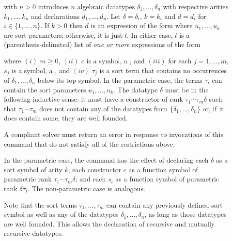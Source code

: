 \begin{description}
%
\item[%
]
with $n > 0$ introduces $n$ algebraic datatypes $\delta_1,\dots,\delta_n$
with respective arities $k_1,\dots,k_n$ and declarations $d_1,\dots,d_n$. 
Let $\delta = \delta_i$, $k = k_i$ and $d = d_i$ for $i \in \{1,\ldots,n\}$.
If $k >0$ then $d$ is an expression of the form 
where $u_1, \ldots, u_k$ are sort parameters;
otherwise, it is just $l$. 
In either case, $l$ is a (parenthesis-delimited) list of \emph{one or more} 
expressions of the form
%
\begin{center}
\end{center}
where 
$(i)$ $m \geq 0$, 
$(ii)$ $c$ is a symbol, a , and 
$(iii)$ for each $j=1,\ldots,m$, $s_j$ is a symbol, a , and 
$(iv)$ $\tau_j$ is a sort term
that contains no occurrences of $\delta_1, \ldots, \delta_n$ below its top symbol.
In the parametric case,
the terms $\tau_i$ can contain the sort parameters $u_1, \ldots, u_k$.
The datatype $\delta$ must be  in the following inductive sense:
it must have a constructor of rank $\tau_1\cdots\tau_m\delta$ 
such that $\tau_1\cdots\tau_m$ does not contain any of the datatypes 
from $\{\delta_1, \ldots, \delta_n\}$ or, if it does contain some, they are well founded.

A compliant solver must return an error in response to invocations of this command 
that do not satisfy all of the restrictions above.  

In the parametric case, 
the command has the effect of declaring each $\delta$ as a sort symbol of arity $k$;
each constructor $c$ as a function symbol of parametric rank $\tau_1\cdots\tau_m\delta$;
and each $s_i$ as a function symbol of parametric rank $\delta\tau_i$.
The non-parametric case is analogous.

Note that the sort terms $\tau_1, \ldots,\tau_m$ can contain any previously defined 
sort symbol as well as any of the datatypes $\delta_1, \ldots, \delta_n$,
as long as those datatypes are well founded.
This allows the declaration of recursive and mutually recursive datatypes.


\end{description}
